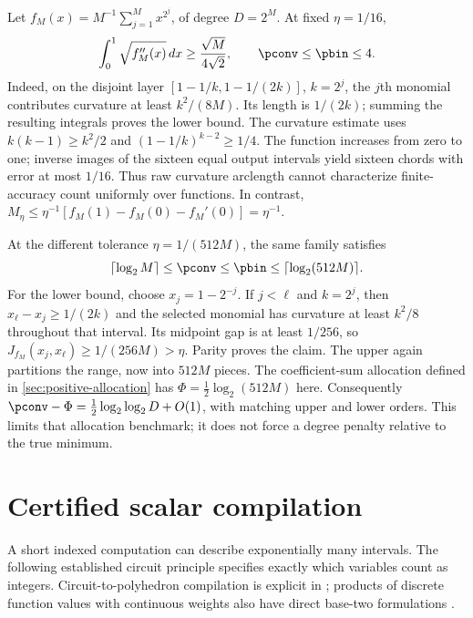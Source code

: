 \begin{example}
\label{ex:positive-degree-gap}
Let $f_M(x)=M^{-1}\sum_{j=1}^M x^{2^j}$, of degree $D=2^M$.
At fixed $\eta=1/16$,
\begin{equation}\label{eq:raw-curvature-obstruction}
 \int_0^1\sqrt{f_M''(x)}\,dx\ge\frac{\sqrt M}{4\sqrt2},
 \qquad \pconv\le\pbin\le4.
\end{equation}
Indeed, on the disjoint layer
$[1-1/k,1-1/(2k)]$, $k=2^j$, the $j$th monomial contributes curvature
at least $k^2/(8M)$. Its length is $1/(2k)$; summing the resulting
integrals proves the lower bound. The curvature estimate uses
$k(k-1)\ge k^2/2$ and $(1-1/k)^{k-2}\ge1/4$.
The function increases from zero to one; inverse images of the sixteen
equal output intervals yield sixteen chords with error at most $1/16$.
Thus raw curvature arclength cannot characterize finite-accuracy count
uniformly over functions. In contrast,
$M_\eta\le\eta^{-1}[f_M(1)-f_M(0)-f_M'(0)]=\eta^{-1}$.

At the different tolerance $\eta=1/(512M)$, the same family satisfies
\begin{equation}\label{eq:degree-allocation-obstruction}
 \lceil\log_2M\rceil\le\pconv\le\pbin
 \le\lceil\log_2(512M)\rceil.
\end{equation}
For the lower bound, choose $x_j=1-2^{-j}$. If $j<\ell$ and $k=2^j$,
then $x_\ell-x_j\ge1/(2k)$ and the selected monomial has curvature
at least $k^2/8$ throughout that interval. Its midpoint gap is at least
$1/256$, so $J_{f_M}(x_j,x_\ell)\ge1/(256M)>\eta$. Parity proves
the claim. The upper again partitions the range, now into $512M$ pieces.
The coefficient-sum allocation defined in \cref{sec:positive-allocation}
has $\Phi=\frac12\log_2(512M)$ here. Consequently
$\pconv-\Phi=\frac12\log_2\log_2D+O(1)$, with matching upper
and lower orders. This limits that allocation benchmark; it does not
force a degree penalty relative to the true minimum.
\end{example}

\section{Certified scalar compilation}\label{sec:scalar-compilation}

A short indexed computation can describe exponentially many intervals.
The following established circuit principle specifies exactly which
variables count as integers. Circuit-to-polyhedron compilation is explicit
in \citet[Section 3, Lemma 1]{avis2019}; products of discrete function
values with continuous weights also have direct base-two formulations
\citep[Section 2]{adams2012}.

